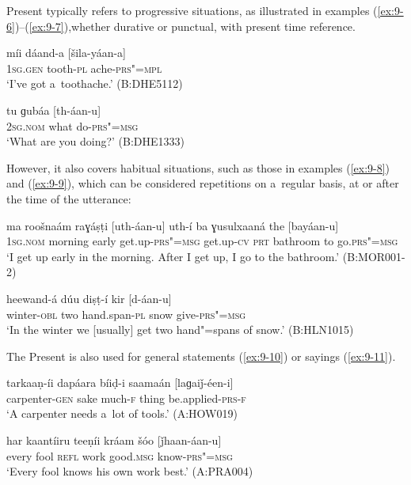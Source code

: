 Present typically refers to progressive situations, as illustrated in examples (\ref{ex:9-6})--(\ref{ex:9-7}),whether durative or punctual, with present time reference.

\begin{exe}
\ex
\label{ex:9-6}
\gll míi dáand-a [šila-yáan-a] \\
\textsc{1sg.gen} tooth-\textsc{pl} ache-\textsc{prs"=mpl} \\
\glt `I've got a~toothache.' (B:DHE5112)

\ex
\label{ex:9-7}
\gll tu ɡubáa [th-áan-u] \\
\textsc{2sg.nom} what do-\textsc{prs"=msg} \\
\glt `What are you doing?' (B:DHE1333)
\end{exe}

However, it also covers habitual situations, such as those in examples (\ref{ex:9-8}) and (\ref{ex:9-9}), which can be considered repetitions on a~regular basis, at or after the time of the utterance: 

\begin{exe}
\ex
\label{ex:9-8}
\gll ma roošnaám raɣáṣṭi [uth-áan-u] uth-í ba ɣusulxaaná the [bayáan-u] \\
\textsc{1sg.nom} morning early get.up-\textsc{prs"=msg} get.up-\textsc{cv}  \textsc{prt} bathroom to go.\textsc{prs"=msg} \\
\glt `I get up early in the morning. After I get up, I go to the bathroom.' (B:MOR001-2)

\ex
\label{ex:9-9}
\gll heewand-á dúu diṣṭ-í kir [d-áan-u] \\
winter-\textsc{obl} two hand.span-\textsc{pl} snow give-\textsc{prs"=msg} \\
\glt `In the winter we [usually] get two hand"=spans of snow.' (B:HLN1015)
\end{exe}

The Present is also used for general statements (\ref{ex:9-10}) or sayings (\ref{ex:9-11}).

\begin{exe}
\ex
\label{ex:9-10}
\gll tarkaaṇ-íi dapáara bíiḍ-i saamaán [laɡaiǰ-éen-i]  \\
carpenter-\textsc{gen} sake much-\textsc{f} thing be.applied-\textsc{prs-f} \\
\glt `A carpenter needs a~lot of tools.' (A:HOW019)

\ex
\label{ex:9-11}
\gll har kaantíiru teeṇíi kráam šóo [ǰhaan-áan-u] \\
every fool \textsc{refl} work good.\textsc{msg} know-\textsc{prs"=msg} \\
\glt `Every fool knows his own work best.' (A:PRA004)
\end{exe}

